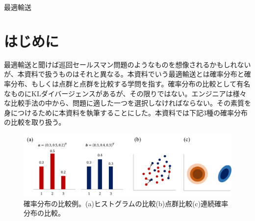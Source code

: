 \documentclass[dvipdfmx, 9pt, a4paper]{jsarticle}
\begin{document}
\begin{center}
{\fontsize{18pt}{1pt}\selectfont 最適輸送}\\
\end{center}

\section*{はじめに}
最適輸送と聞けば巡回セールスマン問題のようなものを想像されるかもしれないが、本資料で扱うものはそれと異なる。本資料でいう最適輸送とは確率分布と確率分布、もしくは点群と点群を比較する学問を指す。確率分布の比較として有名なものにKLダイバージェンスがあるが、その限りではない。エンジニアは様々な比較手法の中から、問題に適した一つを選択しなければならない。その素質を身につけるために本資料を執筆することにした。本資料では下記3種の確率分布の比較を取り扱う。
\begin{figure}[b]
\begin{center}
\includegraphics[width=16cm]{fig1.png}
\caption{確率分布の比較例。(a)ヒストグラムの比較(b)点群比較(c)連続確率分布の比較。}
\end{center}
\end{figure}
\end{document}
